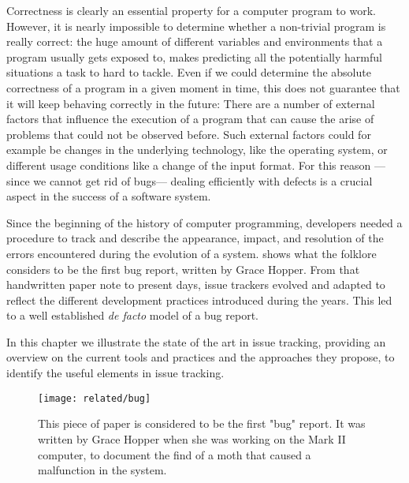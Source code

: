 


Correctness is clearly an essential property for a computer program to work.
However, it is nearly impossible to determine whether a non-trivial program is really correct: the huge amount of different variables and environments that a program usually gets exposed to, makes predicting all the potentially harmful situations a task to hard to tackle.
Even if we could determine the absolute correctness of a program in a given moment in time, this does not guarantee that it will keep behaving correctly in the future: There are a number of external factors that influence the execution of a program that can cause the arise of problems that could not be observed before.
Such external factors could for example be changes in the underlying technology, like the operating system, or different usage conditions like a change of the input format.
For this reason ---since we cannot get rid of bugs--- dealing efficiently with defects is a crucial aspect in the success of a software system.

Since the beginning of the history of computer programming, developers needed a procedure to track and describe the appearance, impact, and resolution of the errors encountered during the evolution of a system.
 shows what the folklore considers to be the first bug report, written by Grace Hopper.
From that handwritten paper note to present days, issue trackers evolved and adapted to reflect the different development practices introduced during the years.
This led to a well established \emph{de facto} model of a bug report.

In this chapter we illustrate the state of the art in issue tracking, providing an overview on the current tools and practices and the approaches they propose, to identify the useful elements in issue tracking.

\begin{figure}[t]
\centering
  \texttt{[image: related/bug]}
  \caption[The first "bug" report.]{This piece of paper is considered to be the first "bug" report. It was written by Grace Hopper when she was working on the Mark II computer, to document the find of a moth that caused a malfunction in the system.}
  \label{fig:first-bug-report}
\end{figure}


